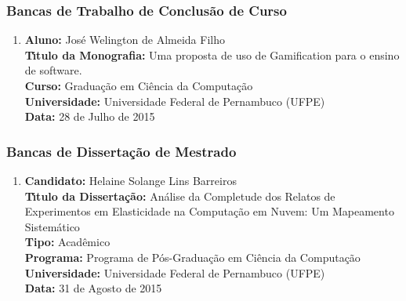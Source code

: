 \documentclass[a4paper,oneside,10pt]{article}
\begin{document}

\subsubsection{Bancas de Trabalho de Conclus\~{a}o de Curso}
\vspace{0.3cm}

\begin{enumerate}
\renewcommand{\labelenumi}{{\large\bfseries\arabic{enumi}.}}
\vspace{0.3cm}

\item       \textbf{Aluno:} José Welington de Almeida Filho \mbox{}\\
            \textbf{T\'{\i}tulo da Monografia:} Uma proposta de uso de Gamification para o ensino de software.\\
            \textbf{Curso:} Graduação em Ciência da Computação\\
            \textbf{Universidade:} Universidade Federal de Pernambuco (UFPE)\\
            \textbf{Data:} 28 de Julho de 2015\\

\end{enumerate}


\subsubsection{Bancas de Disserta\c{c}\~{a}o de Mestrado}
\vspace{0.3cm}

\begin{enumerate}
\renewcommand{\labelenumi}{{\large\bfseries\arabic{enumi}.}}
\vspace{0.3cm}

\item       \textbf{Candidato:} Helaine Solange Lins Barreiros \mbox{} \\
            \textbf{T\'{\i}tulo da Disserta\c{c}\~{a}o:} Análise da Completude dos Relatos de Experimentos em Elasticidade na Computação em Nuvem: Um Mapeamento Sistemático\\
            \textbf{Tipo:} Acadêmico\\
            \textbf{Programa:} Programa de Pós-Graduação em Ciência da Computação\\
            \textbf{Universidade:} Universidade Federal de Pernambuco (UFPE)\\
            \textbf{Data:} 31 de Agosto de 2015

\end{enumerate}
\end{document}
